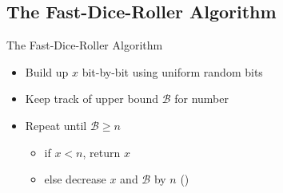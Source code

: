 \subsection{The Fast-Dice-Roller Algorithm}
\begin{frame}{The Fast-Dice-Roller Algorithm}
    \pause 
    \begin{itemize}[<+->]
        \item Build up $x$ bit-by-bit using uniform random bits 
        \item Keep track of upper bound $\mathcal{B}$ for number \onslide<+->{  $\longrightarrow \quad x \in [0,\mathcal{B})$}
        \item Repeat until $\mathcal{B} \geq n$ \begin{itemize}[<+->]
            \item if $x < n$, return $x$
            \item else decrease $x$ and $\mathcal{B}$ by $n$ ()
        \end{itemize}
    \end{itemize}

\end{frame}
\fi 